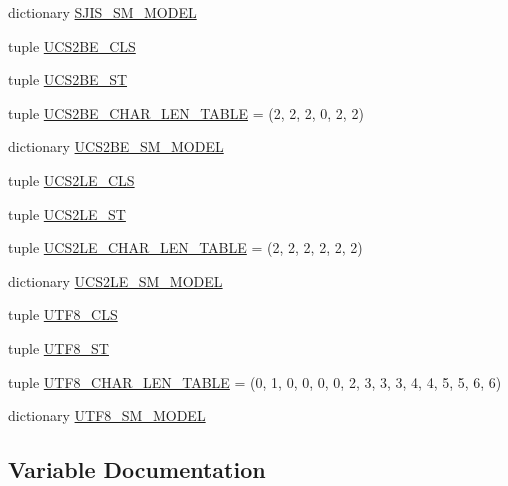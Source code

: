 \begin{DoxyCompactItemize}
dictionary \hyperlink{namespacechardet_1_1mbcssm_a78edb0061ee6849fc919f086b3152458}{S\+J\+I\+S\+\_\+\+S\+M\+\_\+\+M\+O\+D\+EL}
\item 
tuple \hyperlink{namespacechardet_1_1mbcssm_aa5dfd1d0711e72cf3734970e9915925e}{U\+C\+S2\+B\+E\+\_\+\+C\+LS}
\item 
tuple \hyperlink{namespacechardet_1_1mbcssm_aeee6c00546031fa4e21b1ecff391339d}{U\+C\+S2\+B\+E\+\_\+\+ST}
\item 
tuple \hyperlink{namespacechardet_1_1mbcssm_a7f3b243e896c8ad361da4fec8953c568}{U\+C\+S2\+B\+E\+\_\+\+C\+H\+A\+R\+\_\+\+L\+E\+N\+\_\+\+T\+A\+B\+LE} = (2, 2, 2, 0, 2, 2)
\item 
dictionary \hyperlink{namespacechardet_1_1mbcssm_ae4ffd2b549fcab6da4e044a31bc176d4}{U\+C\+S2\+B\+E\+\_\+\+S\+M\+\_\+\+M\+O\+D\+EL}
\item 
tuple \hyperlink{namespacechardet_1_1mbcssm_a05bc414ae25ef532ca20fc0631c7b52f}{U\+C\+S2\+L\+E\+\_\+\+C\+LS}
\item 
tuple \hyperlink{namespacechardet_1_1mbcssm_ab26afce6499837039558e20ada65b7fb}{U\+C\+S2\+L\+E\+\_\+\+ST}
\item 
tuple \hyperlink{namespacechardet_1_1mbcssm_a09ba0815fd7a07ca4f0edd869fc14f96}{U\+C\+S2\+L\+E\+\_\+\+C\+H\+A\+R\+\_\+\+L\+E\+N\+\_\+\+T\+A\+B\+LE} = (2, 2, 2, 2, 2, 2)
\item 
dictionary \hyperlink{namespacechardet_1_1mbcssm_a67f0bbe2fb020654f4a5f8b3c7798b9a}{U\+C\+S2\+L\+E\+\_\+\+S\+M\+\_\+\+M\+O\+D\+EL}
\item 
tuple \hyperlink{namespacechardet_1_1mbcssm_a5b45efa1c34530778cd6121de5adc6e2}{U\+T\+F8\+\_\+\+C\+LS}
\item 
tuple \hyperlink{namespacechardet_1_1mbcssm_a9a3b68e05796cf93a563549e1b1cb93e}{U\+T\+F8\+\_\+\+ST}
\item 
tuple \hyperlink{namespacechardet_1_1mbcssm_af436c4e7a57ce5a9a4dc3d9fd07e8d74}{U\+T\+F8\+\_\+\+C\+H\+A\+R\+\_\+\+L\+E\+N\+\_\+\+T\+A\+B\+LE} = (0, 1, 0, 0, 0, 0, 2, 3, 3, 3, 4, 4, 5, 5, 6, 6)
\item 
dictionary \hyperlink{namespacechardet_1_1mbcssm_ac4df12909ec4a10d0704929cf2c0b06a}{U\+T\+F8\+\_\+\+S\+M\+\_\+\+M\+O\+D\+EL}
\end{DoxyCompactItemize}


\subsection{Variable Documentation}
\mbox{\label{namespacechardet_1_1mbcssm_ab10f95378f2375c3d9a5c206e0f49017}} 

